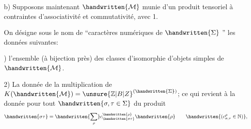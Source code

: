b) Supposons maintenant $\handwritten{\mathcal{M}}$  munie d'un produit tensoriel à contraintes d'associativité et commutativité, avec 1.

On désigne sous le nom de ``caractères numériques de $\handwritten{\Sigma}$ '' les données suivantes:

) l'ensemble (à bijection près) des  classes d'isomorphie d'objets simples de $\handwritten{\mathcal{M}}$.

2) La donnée de la multiplication de $K(\handwritten{\mathcal{M}})={\unsure{\mathbb{Z}|B|Z}}^{(\handwritten{\Sigma})}$; ce qui revient à la donnée pour tout $\handwritten{\sigma,\tau\in\Sigma}$ du produit
\[
\handwritten{\sigma\tau}=\handwritten{\sum_\rho}c_{\handwritten{\sigma\tau}}^{\handwritten{\rho}}\handwritten{\rho}\qquad\handwritten{(c_{\sigma,\tau}^{\rho}\in\mathbb{N})},
\]
